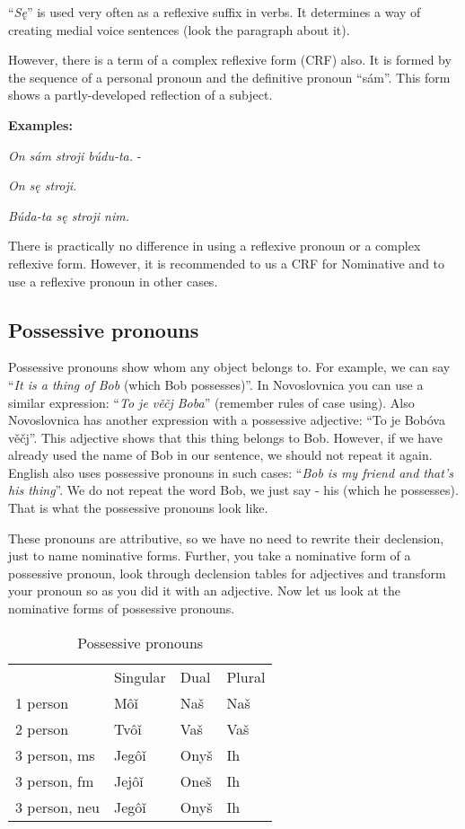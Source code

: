“\textit{Sę}” is used very often as a reflexive suffix in verbs. It determines a way of creating medial voice sentences (look the paragraph about it).

However, there is a term of a complex reflexive form (CRF) also. It is formed by the sequence of a personal pronoun and the definitive pronoun “sám”. This form shows a partly-developed reflection of a subject.  

\textbf{Examples:}

\textit{On sám stroji búdu-ta.} -

\textit{On sę stroji.}

\textit{Búda-ta sę stroji nim.}

There is practically no difference in using a reflexive pronoun or a complex reflexive form. However, it is recommended to us a CRF for Nominative and to use a reflexive pronoun in other cases.

\subsection{Possessive pronouns}

Possessive pronouns show whom any object belongs to. For example, we can say “\textit{It is a thing of Bob} (which Bob possesses)”. In Novoslovnica you can use a similar expression: “\textit{To je věčj Boba}” (remember rules of case using). Also Novoslovnica has another expression with a possessive adjective: “To je Bobóva věčj”. This adjective shows that this thing belongs to Bob. However, if we have already used the name of Bob in our sentence, we should not repeat it again. English also uses possessive pronouns in such cases: “\textit{Bob is my friend and that’s his thing}”. We do not repeat the word Bob, we just say - his (which he possesses). That is what the possessive pronouns look like.

These pronouns are attributive, so we have no need to rewrite their declension, just to name nominative forms. Further, you take a nominative form of a possessive pronoun, look through declension tables for adjectives and transform your pronoun so as you did it with an adjective. Now let us look at the nominative forms of possessive pronouns.

\begin{table}[!htb]
	\caption{Possessive pronouns}
	\begin{tabular}{llll}
		& Singular & Dual & Plural \\
		1 person & Môǐ & Naš & Naš \\
		2 person & Tvôǐ & Vaš & Vaš \\
		3 person, ms & Jegôǐ & Onyš & Ih \\
		3 person, fm & Jejôǐ & Oneš & Ih \\
		3 person, neu & Jegôǐ & Onyš & Ih
	\end{tabular}
\end{table}

